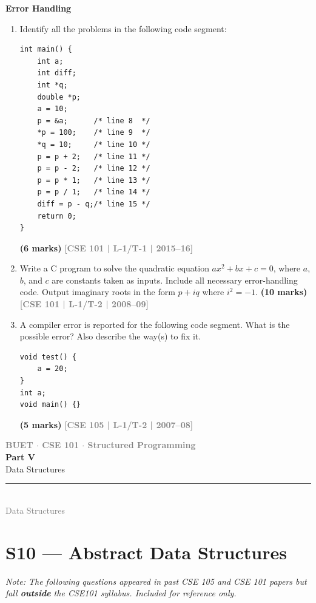 \documentclass[12pt,a3paper]{article}
\newcommand{\yr}[1]{\hfill\textcolor{gray}{\small\textbf{[#1]}}}
\newcommand{\mk}[1]{\textcolor{orange!70!black}{\small\textbf{(#1 marks)}}}
\newcommand{\subtopic}[2]{%
  \vspace{10pt}
  \noindent\begin{tcolorbox}[colback=#1!8,colframe=#1,boxrule=0.6pt,arc=4pt,
    left=6pt,right=6pt,top=4pt,bottom=4pt]
    \small\bfseries\textcolor{#1}{#2}
  \end{tcolorbox}
  \vspace{2pt}
}
\newcommand{\secdivider}[4]{%
  \newpage\thispagestyle{empty}%
  \vspace*{\fill}%
  \begin{tcolorbox}[enhanced,colback=#4!7,colframe=#3,boxrule=1.5pt,arc=8pt,
    left=20pt,right=20pt,top=22pt,bottom=22pt,
    shadow={3pt}{-3pt}{0pt}{black!15}]
    \centering
    {\large\textcolor{gray}{\textbf{BUET $\cdot$ CSE 101 $\cdot$ Structured Programming}}}\\[8pt]
    {\fontsize{26}{32}\selectfont\bfseries\textcolor{#3}{#1}}\\[6pt]
    {\fontsize{15}{19}\selectfont\textcolor{dgray}{#2}}\\[12pt]
    \textcolor{#3!60}{\rule{0.5\textwidth}{0.5pt}}\\[6pt]
    {\small\textcolor{gray}{#2}}
  \end{tcolorbox}%
  \vspace*{\fill}\newpage%
}
\begin{document}
\subtopic{cD}{Error Handling}
\label{sub:s9-error}

\begin{enumerate}

\item Identify all the problems in the following code segment:
 
\begin{lstlisting}
int main() {
    int a;
    int diff;
    int *q;
    double *p;
    a = 10;
    p = &a;      /* line 8  */
    *p = 100;    /* line 9  */
    *q = 10;     /* line 10 */
    p = p + 2;   /* line 11 */
    p = p - 2;   /* line 12 */
    p = p * 1;   /* line 13 */
    p = p / 1;   /* line 14 */
    diff = p - q;/* line 15 */
    return 0;
}
\end{lstlisting}
\mk{6} \yr{CSE 101 | L-1/T-1 | 2015--16}

\item Write a C program to solve the quadratic equation $ax^2 + bx + c = 0$, where $a$, $b$, and $c$ are constants taken as inputs. Include all necessary error-handling code. Output imaginary roots in the form $p + iq$ where $i^2 = -1$.
\mk{10} \yr{CSE 101 | L-1/T-2 | 2008--09}

\item A compiler error is reported for the following code segment. What is the possible error? Also describe the way(s) to fix it.
 
\begin{lstlisting}
void test() {
    a = 20;
}
int a;
void main() {}
\end{lstlisting}
\mk{5} \yr{CSE 105 | L-1/T-2 | 2007--08}

\end{enumerate}

\secdivider{Part V}{Data Structures}{cE}{cE}

\section{S10 --- Abstract Data Structures}
\label{sec:S10}
{\small\textcolor{cE}{\textit{Note: The following questions appeared in past CSE 105 and CSE 101 papers but fall \textbf{outside} the CSE101 syllabus. Included for reference only.}}
\vspace{4pt}}
\end{document}
